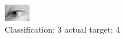 \begin{figure}[h!]
\begin{center}
\includegraphics[width=0.60\columnwidth]{figures/ID2900_class_3_target_4.png}
\end{center}
\caption{ Classification: 3 actual target: 4}
\label{fig:ID2900_class_3_target_4}
\end{figure}
